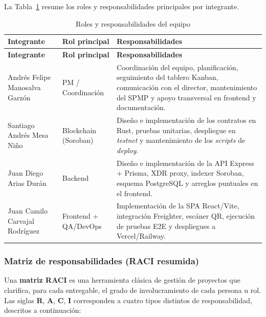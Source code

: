 \documentclass[12pt,oneside]{report}
\begin{document}
      La Tabla~\ref{tab:roles-responsabilidades} resume los roles y responsabilidades principales por integrante.

      \begin{longtable}{@{}p{4.0cm} p{3.6cm} p{7.2cm}@{}}
        \caption{Roles y responsabilidades del equipo}
        \label{tab:roles-responsabilidades}\\
        \toprule
        \textbf{Integrante} & \textbf{Rol principal} & \textbf{Responsabilidades}\\
        \midrule
        \endfirsthead
        \toprule
        \textbf{Integrante} & \textbf{Rol principal} & \textbf{Responsabilidades}\\
        \midrule
        \endhead
        \bottomrule
        \endfoot
        Andrés Felipe Manosalva Garzón & PM / Coordinación & Coordinación del equipo, planificación, seguimiento del tablero Kanban, comunicación con el director, mantenimiento del SPMP y apoyo transversal en frontend y documentación.\\
        Santiago Andrés Mesa Niño & Blockchain (Soroban) & Diseño e implementación de los contratos en Rust, pruebas unitarias, despliegue en \textit{testnet} y mantenimiento de los \textit{scripts} de \textit{deploy}.\\
        Juan Diego Arias Durán & Backend & Diseño e implementación de la API Express + Prisma, XDR proxy, indexer Soroban, esquema PostgreSQL y arreglos puntuales en el frontend.\\
        Juan Camilo Carvajal Rodríguez & Frontend + QA/DevOps & Implementación de la SPA React/Vite, integración Freighter, escáner QR, ejecución de pruebas E2E y despliegues a Vercel/Railway.\\
      \end{longtable}

      \subsubsection{Matriz de responsabilidades (RACI resumida)}
      Una \textbf{matriz RACI} es una herramienta clásica de gestión de proyectos que clarifica, para cada entregable, el grado de involucramiento de cada persona u rol. Las siglas \textbf{R}, \textbf{A}, \textbf{C}, \textbf{I} corresponden a cuatro tipos distintos de responsabilidad, descritos a continuación:
\end{document}
